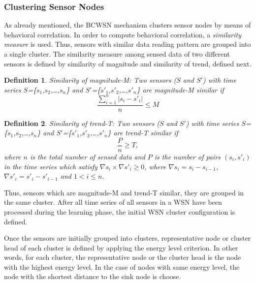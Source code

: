 \documentclass[conference]{IEEEtran}
\begin{document}
\subsubsection{Clustering Sensor Nodes}
\label{clustering-sensors}

As already mentioned, the BCWSN mechanism clusters sensor nodes by means of
behavioral correlation. In order to compute behavioral correlation, a
\textit{similarity measure} \cite{Liu2007} is used. Thus, sensors with similar
data reading pattern are grouped into a single cluster. The similarity measure
among sensed data of two different sensors is defined by  similarity of
magnitude and similarity of trend, defined next.

\newtheorem{defini}{Definition}

\begin{defini}
Similarity of magnitude-M: Two sensors ($S$ and $S'$) with time series
$S$=\{$s_{1}$,$s_{2}$,\ldots,$s_{n}$\} and
$S'$=\{$s'_{1}$,$s'_{2}$,\ldots,$s'_{n}$\} are magnitude-M similar if 
\begin{equation}
\label{equ:magni}
\frac{\sum_{i=1}^{n} |s_{i}-s'_{i}|}{n} \leq M
\end{equation}
\end{defini}

\begin{defini}
Similarity of trend-T: Two sensors ($S$ and $S'$) with time series
$S$=\{$s_{1}$,$s_{2}$,\ldots,$s_{n}$\} and
$S'$=\{$s'_{1}$,$s'_{2}$,\ldots,$s'_{n}$\} are trend-T similar if 
\begin{equation}
\label{equ:trend}
\frac{P}{n} \geq T,
\end{equation}
where $n$ is the total number of sensed data and $P$ is the number of pairs
$(s_{i},s'_{i})$ in the time series which satisfy $\nabla s_{i} \times \nabla
s'_{i} \geq 0$, where $\nabla s_{i} = s_{i} - s_{i-1}$, $\nabla
s'_{i} = s'_{i} - s'_{i-1}$ and $1 < i \leq n$.
\end{defini}

Thus, sensors which are magnitude-M and trend-T similar, they are grouped in the
same cluster. After all time series of all sensors in a WSN have been processed
during the learning phase, the initial WSN cluster configuration is defined.

Once the sensors are initially grouped into clusters, representative node or
cluster head of each cluster is defined by applying the energy level criterion.
In other words, for each cluster, the representative node or the cluster head
is the node with the highest energy level. In the case of nodes with same energy
level, the node with the shortest distance to the sink node is choose.
\end{document}
